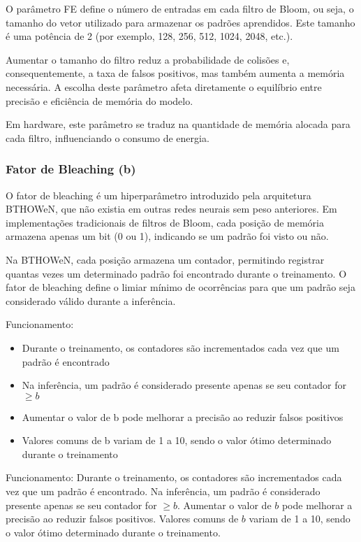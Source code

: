 \documentclass{article}
\begin{document}
O parâmetro FE define o número de entradas em cada filtro de Bloom, ou seja, o tamanho do vetor utilizado para armazenar os padrões aprendidos. Este tamanho é uma potência de 2 (por exemplo, 128, 256, 512, 1024, 2048, etc.).

Aumentar o tamanho do filtro reduz a probabilidade de colisões e, consequentemente, a taxa de falsos positivos, mas também aumenta a memória necessária. A escolha deste parâmetro afeta diretamente o equilíbrio entre precisão e eficiência de memória do modelo.

Em hardware, este parâmetro se traduz na quantidade de memória alocada para cada filtro, influenciando o consumo de energia.

\subsubsection{Fator de Bleaching (b)}

O fator de bleaching é um hiperparâmetro introduzido pela arquitetura BTHOWeN, que não existia em outras redes neurais sem peso anteriores. Em implementações tradicionais de filtros de Bloom, cada posição de memória armazena apenas um bit (0 ou 1), indicando se um padrão foi visto ou não. 

Na BTHOWeN, cada posição armazena um contador, permitindo registrar quantas vezes um determinado padrão foi encontrado durante o treinamento. O fator de bleaching define o limiar mínimo de ocorrências para que um padrão seja considerado válido durante a inferência.

Funcionamento:
\begin{itemize}
    \item Durante o treinamento, os contadores são incrementados cada vez que um padrão é encontrado
    \item Na inferência, um padrão é considerado presente apenas se seu contador for $\geq b$
    \item Aumentar o valor de b pode melhorar a precisão ao reduzir falsos positivos
    \item Valores comuns de b variam de 1 a 10, sendo o valor ótimo determinado durante o treinamento
\end{itemize}


Funcionamento: Durante o treinamento, os contadores são incrementados cada vez que um padrão é encontrado. Na inferência, um padrão é considerado presente apenas se seu contador for $\geq b$. Aumentar o valor de $b$ pode melhorar a precisão ao reduzir falsos positivos. Valores comuns de $b$ variam de 1 a 10, sendo o valor ótimo determinado durante o treinamento.
\end{document}
